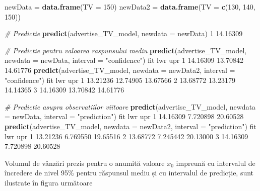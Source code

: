 \documentclass[]{article}
\newenvironment{Shaded}{\begin{snugshade}}{\end{snugshade}}
\newcommand{\KeywordTok}[1]{\textcolor[rgb]{0.13,0.29,0.53}{\textbf{#1}}}
\newcommand{\DataTypeTok}[1]{\textcolor[rgb]{0.13,0.29,0.53}{#1}}
\newcommand{\DecValTok}[1]{\textcolor[rgb]{0.00,0.00,0.81}{#1}}
\newcommand{\FloatTok}[1]{\textcolor[rgb]{0.00,0.00,0.81}{#1}}
\newcommand{\StringTok}[1]{\textcolor[rgb]{0.31,0.60,0.02}{#1}}
\newcommand{\CommentTok}[1]{\textcolor[rgb]{0.56,0.35,0.01}{\textit{#1}}}
\newcommand{\NormalTok}[1]{#1}
\begin{document}
\begin{Shaded}
\begin{Highlighting}[]
\NormalTok{newData =}\StringTok{ }\KeywordTok{data.frame}\NormalTok{(}\DataTypeTok{TV =} \DecValTok{150}\NormalTok{)}
\NormalTok{newData2 =}\StringTok{ }\KeywordTok{data.frame}\NormalTok{(}\DataTypeTok{TV =} \KeywordTok{c}\NormalTok{(}\DecValTok{130}\NormalTok{, }\DecValTok{140}\NormalTok{, }\DecValTok{150}\NormalTok{))}

\CommentTok{# Predictie}
\KeywordTok{predict}\NormalTok{(advertise_TV_model, }\DataTypeTok{newdata =}\NormalTok{ newData)}
       \DecValTok{1} 
\FloatTok{14.16309} 

\CommentTok{# Predictie pentru valoarea raspunsului mediu}
\KeywordTok{predict}\NormalTok{(advertise_TV_model, }\DataTypeTok{newdata =}\NormalTok{ newData, }\DataTypeTok{interval =} \StringTok{"confidence"}\NormalTok{)}
\NormalTok{       fit      lwr      upr}
\DecValTok{1} \FloatTok{14.16309} \FloatTok{13.70842} \FloatTok{14.61776}
\KeywordTok{predict}\NormalTok{(advertise_TV_model, }\DataTypeTok{newdata =}\NormalTok{ newData2, }\DataTypeTok{interval =} \StringTok{"confidence"}\NormalTok{)}
\NormalTok{       fit      lwr      upr}
\DecValTok{1} \FloatTok{13.21236} \FloatTok{12.74905} \FloatTok{13.67566}
\DecValTok{2} \FloatTok{13.68772} \FloatTok{13.23179} \FloatTok{14.14365}
\DecValTok{3} \FloatTok{14.16309} \FloatTok{13.70842} \FloatTok{14.61776}

\CommentTok{# Predictie asupra observatiilor viitoare}
\KeywordTok{predict}\NormalTok{(advertise_TV_model, }\DataTypeTok{newdata =}\NormalTok{ newData, }\DataTypeTok{interval =} \StringTok{"prediction"}\NormalTok{)}
\NormalTok{       fit      lwr      upr}
\DecValTok{1} \FloatTok{14.16309} \FloatTok{7.720898} \FloatTok{20.60528}
\KeywordTok{predict}\NormalTok{(advertise_TV_model, }\DataTypeTok{newdata =}\NormalTok{ newData2, }\DataTypeTok{interval =} \StringTok{"prediction"}\NormalTok{)}
\NormalTok{       fit      lwr      upr}
\DecValTok{1} \FloatTok{13.21236} \FloatTok{6.769550} \FloatTok{19.65516}
\DecValTok{2} \FloatTok{13.68772} \FloatTok{7.245442} \FloatTok{20.13000}
\DecValTok{3} \FloatTok{14.16309} \FloatTok{7.720898} \FloatTok{20.60528}
\end{Highlighting}
\end{Shaded}

Volumul de vânzări prezis pentru o anumită valoare \(x_0\) impreună cu
intervalul de încredere de nivel 95\% pentru răspunsul mediu și cu
intervalul de predicție, sunt ilustrate în figura următoare
\end{document}

